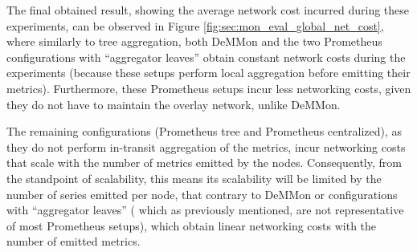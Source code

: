 The final obtained result, showing the average network cost incurred during these experiments, can be observed in Figure \ref{fig:sec:mon_eval_global_net_cost}, where similarly to tree aggregation, both DeMMon and the two Prometheus configurations with ``aggregator leaves'' obtain constant network costs during the experiments (because these setups perform local aggregation before emitting their metrics). Furthermore, these Prometheus setups incur less networking costs, given they do not have to maintain the overlay network, unlike DeMMon. 

The remaining configurations (Prometheus tree and Prometheus centralized), as they do not perform in-transit aggregation of the metrics, incur networking costs that scale with the number of metrics emitted by the nodes. Consequently, from the standpoint of scalability, this means its scalability will be limited by the number of series emitted per node, that contrary to DeMMon or configurations with ``aggregator leaves'' ( which as previously mentioned, are not representative of most Prometheus setups), which obtain linear networking costs with the number of emitted metrics.


